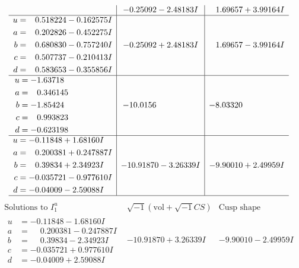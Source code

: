 \documentclass[1p]{elsarticle_modified}
\theoremstyle{definition}
\newcommand{\I}{\sqrt{-1}}
\begin{document}
$$\begin{array}{c|c|c}
 & -0.25092 - 2.48183 I & \phantom{-}1.69657 + 3.99164 I \\ \hline\begin{aligned}
u &= \phantom{-}0.518224 - 0.162575 I \\
a &= \phantom{-}0.202826 - 0.452275 I \\
b &= \phantom{-}0.680830 - 0.757240 I \\
c &= \phantom{-}0.507737 - 0.210413 I \\
d &= \phantom{-}0.583653 - 0.355856 I\end{aligned}
 & -0.25092 + 2.48183 I & \phantom{-}1.69657 - 3.99164 I \\ \hline\begin{aligned}
u &= -1.63718\phantom{ +0.000000I} \\
a &= \phantom{-}0.346145\phantom{ +0.000000I} \\
b &= -1.85424\phantom{ +0.000000I} \\
c &= \phantom{-}0.993823\phantom{ +0.000000I} \\
d &= -0.623198\phantom{ +0.000000I}\end{aligned}
 & -10.0156\phantom{ +0.000000I} & -8.03320\phantom{ +0.000000I} \\ \hline\begin{aligned}
u &= -0.11848 + 1.68160 I \\
a &= \phantom{-}0.200381 + 0.247887 I \\
b &= \phantom{-}0.39834 + 2.34923 I \\
c &= -0.035721 - 0.977610 I \\
d &= -0.04009 - 2.59088 I\end{aligned}
 & -10.91870 - 3.26339 I & -9.90010 + 2.49959 I\\
 \hline 
 \end{array}$$\newpage$$\begin{array}{c|c|c}  
\text{Solutions to }I^u_{1}& \I (\text{vol} + \sqrt{-1}CS) & \text{Cusp shape}\\
 \hline 
\begin{aligned}
u &= -0.11848 - 1.68160 I \\
a &= \phantom{-}0.200381 - 0.247887 I \\
b &= \phantom{-}0.39834 - 2.34923 I \\
c &= -0.035721 + 0.977610 I \\
d &= -0.04009 + 2.59088 I\end{aligned}
 & -10.91870 + 3.26339 I & -9.90010 - 2.49959 I \\ \hline\begin{aligned}

\end{aligned}
\end{array}$$
\end{document}
